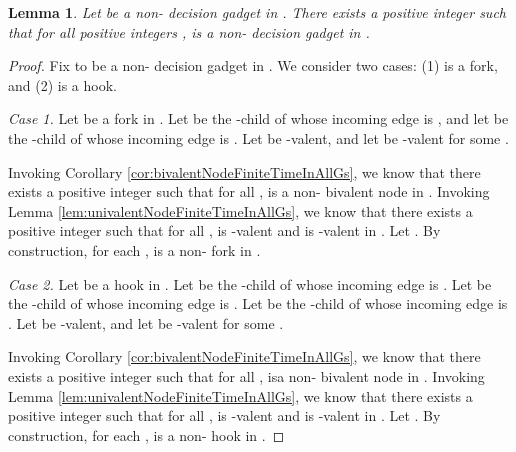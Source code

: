 \documentclass[11pt]{article}
\numberwithin{theorem}{section}
\newtheorem{lemma}[theorem]{Lemma}
\begin{document}
\begin{lemma}\label{lem:decisionGadgetStableInAllGs}
Let  be a non- decision gadget in . There exists a positive integer  such that for all positive integers ,  is a non- decision gadget in .
\end{lemma}
\begin{proof}
Fix  to be a non- decision gadget in . We consider two cases: (1)  is a fork, and (2)  is a hook.

\emph{Case 1.} Let  be a fork  in . Let  be the -child of  whose incoming edge is , and let  be the -child of  whose incoming edge is . Let  be -valent, and let  be -valent for some . 

Invoking Corollary \ref{cor:bivalentNodeFiniteTimeInAllGs}, we know that there exists a positive integer  such that for all ,  is a non- bivalent node in .
Invoking Lemma \ref{lem:univalentNodeFiniteTimeInAllGs}, we know that there exists a positive integer  such that for all ,  is -valent and   is -valent in .
Let . By construction, for each ,  is a non- fork in .

\emph{Case 2.} Let  be a hook  in . Let  be the -child of  whose incoming edge is . Let  be the -child of  whose incoming edge is . Let  be the -child of  whose incoming edge is . Let  be -valent, and let  be -valent for some . 

Invoking Corollary \ref{cor:bivalentNodeFiniteTimeInAllGs}, we know that there exists a positive integer  such that for all ,  isa non-  bivalent node in . Invoking Lemma \ref{lem:univalentNodeFiniteTimeInAllGs}, we know that there exists a positive integer  such that for all ,  is -valent and   is -valent in .
Let . By construction, for each ,  is a non- hook in .
\end{proof}
\end{document}
